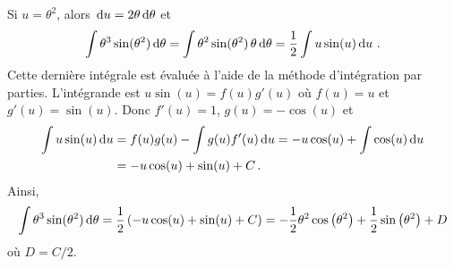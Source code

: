 { Si $u = \theta^2$, alors
$\,\mathrm{d}u = 2 \theta \,\mathrm{d}\theta$ et
\[
\int \theta^3 \sin(\theta^2) \,\mathrm{d}\theta =
\int \theta^2 \sin(\theta^2) \,\theta \,\mathrm{d}\theta =
\frac{1}{2} \int u \sin(u) \,\mathrm{d}u \ .
\]
Cette dernière intégrale est évaluée à l'aide de la méthode
d'intégration par parties.  L'intégrande est
$u \sin(u) = f(u)g'(u)$ où $f(u)=u$ et $g'(u) = \sin(u)$.  Donc
$f'(u)=1$, $g(u) = -\cos(u)$ et
\begin{align*}
\int u \sin(u) \,\mathrm{d}u &= f(u)g(u)-\int g(u)f'(u) \,\mathrm{d}u
= -u \cos(u) + \int \cos(u) \,\mathrm{d}u \\
&= -u \cos(u) + \sin(u) + C \, .
\end{align*}
Ainsi,
\[
\int \theta^3 \sin(\theta^2) \,\mathrm{d}\theta =
\frac{1}{2} \left( -u \cos(u) + \sin(u) + C \right)
= -\frac{1}{2} \theta^2 \cos\left(\theta^2\right)
+ \frac{1}{2} \sin\left(\theta^2\right) + D
\]
où $D = C/2$.
}

